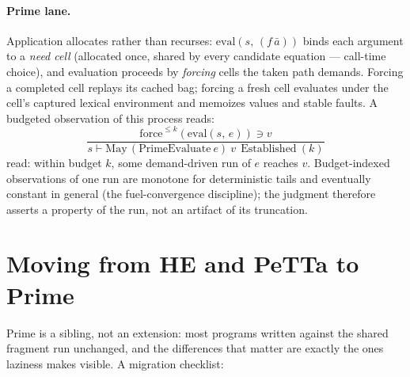 \documentclass[11pt]{article}
\newcommand{\eval}[2]{\mathrm{eval}(#1,\,#2)}
\newcommand{\PeTTa}{\textup{PeTTa}}
\newcommand{\HE}{\textup{HE}}
\begin{document}
\paragraph{Prime lane.}  Application allocates rather than recurses:
$\eval{s}{(f\,\bar a)}$ binds each argument to a \emph{need cell}
(allocated once, shared by every candidate equation --- call-time
choice), and evaluation proceeds by \emph{forcing} cells the taken path
demands.  Forcing a completed cell replays its cached bag; forcing a
fresh cell evaluates under the cell's captured lexical environment and
memoizes values and stable faults.  A budgeted observation of this
process reads:
\[
\frac{\mathrm{force}^{\le k}(\eval{s}{e}) \ni v}
     {s \vdash \mathrm{May}\,(\mathrm{PrimeEvaluate}\ e)\ v\ \ \text{Established}\ (k)}
\]
read: within budget $k$, some demand-driven run of $e$ reaches $v$.
Budget-indexed observations of one run are monotone for deterministic
tails and eventually constant in general (the fuel-convergence
discipline); the judgment therefore asserts a property of the run, not
an artifact of its truncation.


\section{Moving from \HE{} and \PeTTa{} to Prime}
\label{app:migration}

Prime is a sibling, not an extension: most programs written against the
shared fragment run unchanged, and the differences that matter are
exactly the ones laziness makes visible.  A migration checklist:
\end{document}
